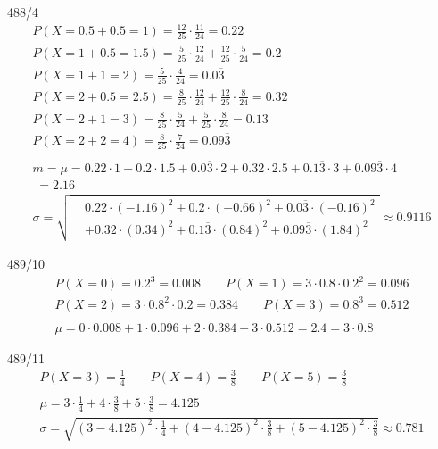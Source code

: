 \begin{exercise}{488/4}
  \begin{gather*}
    P(X = 0.5 + 0.5 = 1) = \frac{12}{25} \cdot \frac{11}{24} = 0.22 \\
    P(X = 1 + 0.5 = 1.5) = \frac{5}{25} \cdot \frac{12}{24} + \frac{12}{25} \cdot \frac{5}{24} = 0.2 \\
    P(X = 1 + 1 = 2) = \frac{5}{25} \cdot \frac{4}{24} = 0.0\overline{3} \\
    P(X = 2 + 0.5 = 2.5) = \frac{8}{25} \cdot \frac{12}{24} + \frac{12}{25} \cdot \frac{8}{24} = 0.32 \\
    P(X = 2 + 1 = 3) = \frac{8}{25} \cdot \frac{5}{24} + \frac{5}{25} \cdot \frac{8}{24} = 0.1\overline{3} \\
    P(X = 2 + 2 = 4) = \frac{8}{25} \cdot \frac{7}{24} = 0.09\overline{3} \\\\
    m = \mu = 0.22 \cdot 1 + 0.2 \cdot 1.5 + 0.0\overline{3} \cdot 2 + 0.32 \cdot 2.5 + 0.1\overline{3} \cdot 3 + 0.09\overline{3} \cdot 4 \\
    \;= 2.16 \\
    \sigma = \sqrt{
      \begin{aligned}
        &0.22 \cdot (-1.16)^2 + 0.2 \cdot (-0.66)^2 + 0.0\overline{3} \cdot (-0.16)^2 \\
        &+ 0.32 \cdot (0.34)^2 + 0.1\overline{3} \cdot (0.84)^2 + 0.09\overline{3} \cdot (1.84)^2
      \end{aligned}
    } \approx 0.9116
  \end{gather*}
\end{exercise}
\begin{exercise}{489/10}
  \begin{gather*}
    P(X = 0) = 0.2^3 = 0.008 \qquad P(X = 1) = 3 \cdot 0.8 \cdot 0.2^2 = 0.096 \\
    P(X = 2) = 3 \cdot 0.8^2 \cdot 0.2 = 0.384 \qquad P(X = 3) = 0.8^3 = 0.512 \\\\
    \mu = 0 \cdot 0.008 + 1 \cdot 0.096 + 2 \cdot 0.384 + 3 \cdot 0.512 = 2.4 = 3 \cdot 0.8
  \end{gather*}
\end{exercise}
\begin{exercise}{489/11}
  \begin{gather*}
    P(X = 3) = \frac{1}{4} \qquad P(X = 4) = \frac{3}{8} \qquad P(X = 5) = \frac{3}{8} \\\\
    \mu = 3 \cdot \frac{1}{4} + 4 \cdot \frac{3}{8} + 5 \cdot \frac{3}{8} = 4.125 \\
    \sigma = \sqrt{(3 - 4.125)^2 \cdot \frac{1}{4} + (4 - 4.125)^2 \cdot \frac{3}{8} + (5 - 4.125)^2 \cdot \frac{3}{8}} \approx 0.781
  \end{gather*}
\end{exercise}
